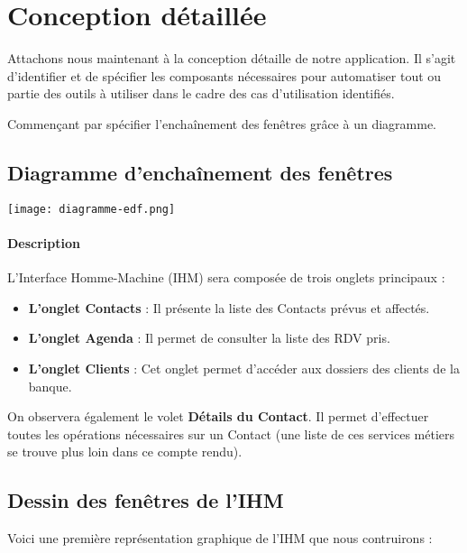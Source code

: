 
\section{Conception détaillée}

Attachons nous maintenant à la conception détaille de notre application. Il s'agit
d'identifier et de spécifier les composants nécessaires pour automatiser tout ou
partie des outils à utiliser dans le cadre des cas d'utilisation identifiés.

Commençant par spécifier l'enchaînement des fenêtres grâce à un diagramme.

\subsection{Diagramme d'enchaînement des fenêtres}

\begin {center}
\texttt{[image: diagramme-edf.png]}
\end {center}

\paragraph{Description}

L'Interface Homme-Machine (IHM) sera composée de trois onglets
principaux :

\begin{itemize}
\item \textbf{L'onglet Contacts} : Il présente la liste des Contacts prévus et affectés.
\item \textbf{L'onglet Agenda} : Il permet de consulter la liste des RDV pris.
\item \textbf{L'onglet Clients} : Cet onglet permet d'accéder aux dossiers des clients de la banque.
\end{itemize}

On observera également le volet \textbf{Détails du Contact}. Il permet d'effectuer toutes les
opérations nécessaires sur un Contact (une liste de ces services métiers se trouve plus loin
dans ce compte rendu).

\subsection{Dessin des fenêtres de l'IHM}

Voici une première représentation graphique de l'IHM que nous contruirons :

